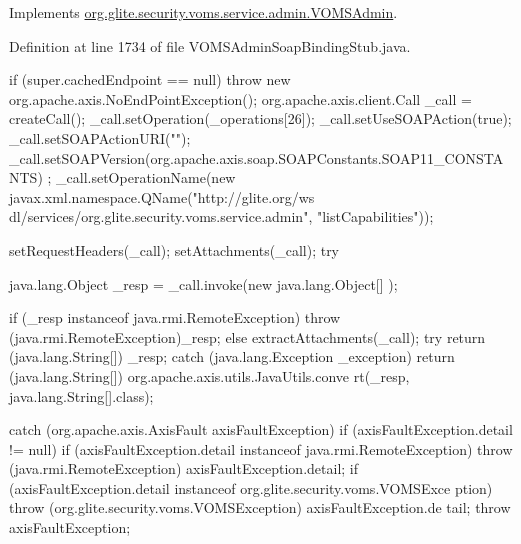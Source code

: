 Implements \hyperlink{interfaceorg_1_1glite_1_1security_1_1voms_1_1service_1_1admin_1_1VOMSAdmin_a34f85e3dac9841ee75cd180e76985efb}{org.glite.security.voms.service.admin.VOMSAdmin}.



Definition at line 1734 of file VOMSAdminSoapBindingStub.java.


\begin{DoxyCode}
                                                                                 
                                             {
        if (super.cachedEndpoint == null) {
            throw new org.apache.axis.NoEndPointException();
        }
        org.apache.axis.client.Call _call = createCall();
        _call.setOperation(_operations[26]);
        _call.setUseSOAPAction(true);
        _call.setSOAPActionURI("");
        _call.setSOAPVersion(org.apache.axis.soap.SOAPConstants.SOAP11_CONSTANTS)
      ;
        _call.setOperationName(new javax.xml.namespace.QName("http://glite.org/ws
      dl/services/org.glite.security.voms.service.admin", "listCapabilities"));

        setRequestHeaders(_call);
        setAttachments(_call);
 try {        java.lang.Object _resp = _call.invoke(new java.lang.Object[] {});

        if (_resp instanceof java.rmi.RemoteException) {
            throw (java.rmi.RemoteException)_resp;
        }
        else {
            extractAttachments(_call);
            try {
                return (java.lang.String[]) _resp;
            } catch (java.lang.Exception _exception) {
                return (java.lang.String[]) org.apache.axis.utils.JavaUtils.conve
      rt(_resp, java.lang.String[].class);
            }
        }
  } catch (org.apache.axis.AxisFault axisFaultException) {
    if (axisFaultException.detail != null) {
        if (axisFaultException.detail instanceof java.rmi.RemoteException) {
              throw (java.rmi.RemoteException) axisFaultException.detail;
         }
        if (axisFaultException.detail instanceof org.glite.security.voms.VOMSExce
      ption) {
              throw (org.glite.security.voms.VOMSException) axisFaultException.de
      tail;
         }
   }
  throw axisFaultException;
}
    }
\end{DoxyCode}
